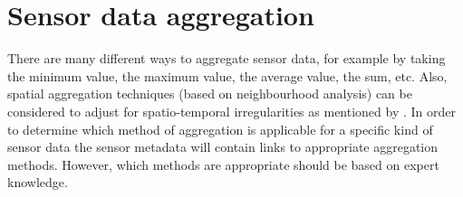 \section{Sensor data aggregation}
There are many different ways to aggregate sensor data, for example by taking the minimum value, the maximum value, the average value, the sum, etc. Also, spatial aggregation techniques (based on neighbourhood analysis) can be considered to adjust for spatio-temporal irregularities as mentioned by \cite{SW:Ganesan}. In order to determine which method of aggregation is applicable for a specific kind of sensor data the sensor metadata will contain links to appropriate aggregation methods. However, which methods are appropriate should be based on expert knowledge.

